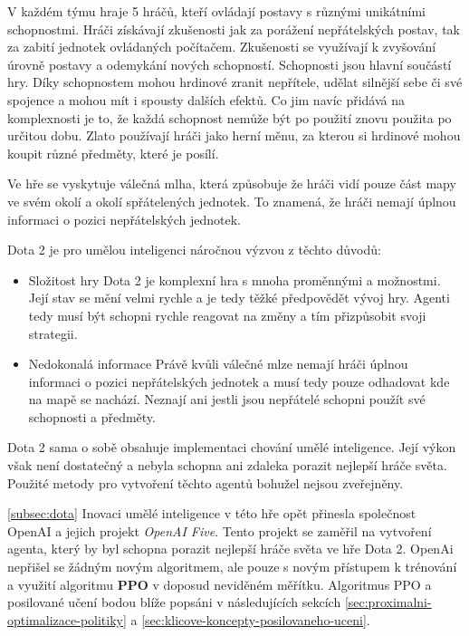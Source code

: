 V každém týmu hraje 5 hráčů, kteří ovládají postavy s různými unikátními schopnostmi.
Hráči získávají zkušenosti jak za porážení nepřátelských postav, tak za zabití jednotek ovládaných počítačem.
Zkušenosti se využívají k zvyšování úrovně postavy a odemykání nových schopností.
Schopnosti jsou hlavní součástí hry.
Díky schopnostem mohou hrdinové zranit nepřítele, udělat silnější sebe či své spojence a mohou mít i spousty dalších efektů.
Co jim navíc přidává na komplexnosti je to, že každá schopnost nemůže být po použití znovu použita po určitou dobu.
Zlato používají hráči jako herní měnu, za kterou si hrdinové mohou koupit různé předměty, které je posílí.

Ve hře se vyskytuje válečná mlha, která způsobuje že hráči vidí pouze část mapy ve svém okolí a okolí spřátelených jednotek.
To znamená, že hráči nemají úplnou informaci o pozici nepřátelských jednotek.

\bigskip

Dota 2 je pro umělou inteligenci náročnou výzvou z těchto důvodů:
\begin{itemize}
  \item Složitost hry
  Dota 2 je komplexní hra s mnoha proměnnými a možnostmi.
  Její stav se mění velmi rychle a je tedy těžké předpovědět vývoj hry.
  Agenti tedy musí být schopni rychle reagovat na změny a tím přizpůsobit svoji strategii.
  \item Nedokonalá informace
  Právě kvůli válečné mlze nemají hráči úplnou informaci o pozici nepřátelských jednotek a musí tedy pouze odhadovat kde na mapě se nachází.
  Neznají ani jestli jsou nepřátelé schopni použít své schopnosti a předměty.
\end{itemize}

Dota 2 sama o sobě obsahuje implementaci chování umělé inteligence.
Její výkon však není dostatečný a nebyla schopna ani zdaleka porazit nejlepší hráče světa.
Použité metody pro vytvoření těchto agentů bohužel nejsou zveřejněny.

\ref{subsec:dota}
Inovaci umělé inteligence v této hře opět přinesla společnost OpenAI a jejich projekt \emph{OpenAI Five}\cite{Dota2}.
Tento projekt se zaměřil na vytvoření agenta, který by byl schopna porazit nejlepší hráče světa ve hře Dota 2.
OpenAi nepřišel se žádným novým algoritmem, ale pouze s novým přístupem k trénování a využití algoritmu \textbf{PPO} v doposud neviděném měřítku. 
Algoritmus PPO a posilované učení bodou blíže popsáni v následujících sekcích \ref{sec:proximalni-optimalizace-politiky} a \ref{sec:klicove-koncepty-posilovaneho-uceni}.

